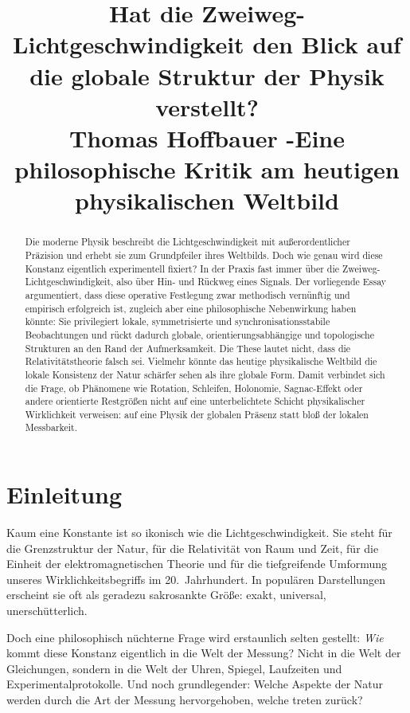 \documentclass[11pt,a4paper]{article}
\title{\textbf{Hat die Zweiweg-Lichtgeschwindigkeit den Blick auf die globale Struktur der Physik verstellt?}\\
	\large Thomas Hoffbauer -Eine philosophische Kritik am heutigen physikalischen Weltbild}
\author{}
\date{}
\theoremstyle{remark}
\begin{document}
	\maketitle
	
	\begin{abstract}
		Die moderne Physik beschreibt die Lichtgeschwindigkeit mit außerordentlicher Präzision und erhebt sie zum Grundpfeiler ihres Weltbilds. Doch wie genau wird diese Konstanz eigentlich experimentell fixiert? In der Praxis fast immer über die Zweiweg-Lichtgeschwindigkeit, also über Hin- und Rückweg eines Signals. Der vorliegende Essay argumentiert, dass diese operative Festlegung zwar methodisch vernünftig und empirisch erfolgreich ist, zugleich aber eine philosophische Nebenwirkung haben könnte: Sie privilegiert lokale, symmetrisierte und synchronisationsstabile Beobachtungen und rückt dadurch globale, orientierungsabhängige und topologische Strukturen an den Rand der Aufmerksamkeit. Die These lautet nicht, dass die Relativitätstheorie falsch sei. Vielmehr könnte das heutige physikalische Weltbild die lokale Konsistenz der Natur schärfer sehen als ihre globale Form. Damit verbindet sich die Frage, ob Phänomene wie Rotation, Schleifen, Holonomie, Sagnac-Effekt oder andere orientierte Restgrößen nicht auf eine unterbelichtete Schicht physikalischer Wirklichkeit verweisen: auf eine Physik der globalen Präsenz statt bloß der lokalen Messbarkeit.
	\end{abstract}
	
	\section*{Einleitung}
	
	Kaum eine Konstante ist so ikonisch wie die Lichtgeschwindigkeit. Sie steht für die Grenzstruktur der Natur, für die Relativität von Raum und Zeit, für die Einheit der elektromagnetischen Theorie und für die tiefgreifende Umformung unseres Wirklichkeitsbegriffs im 20.\ Jahrhundert. In populären Darstellungen erscheint sie oft als geradezu sakrosankte Größe: exakt, universal, unerschütterlich.
	
	Doch eine philosophisch nüchterne Frage wird erstaunlich selten gestellt: \emph{Wie} kommt diese Konstanz eigentlich in die Welt der Messung? Nicht in die Welt der Gleichungen, sondern in die Welt der Uhren, Spiegel, Laufzeiten und Experimentalprotokolle. Und noch grundlegender: Welche Aspekte der Natur werden durch die Art der Messung hervorgehoben, welche treten zurück?
	
\end{document}
